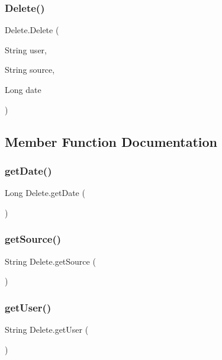 \subsubsection{\texorpdfstring{Delete()}{Delete()}}
{\footnotesize\ttfamily Delete.\+Delete (\begin{DoxyParamCaption}\item[{String}]{user,  }\item[{String}]{source,  }\item[{Long}]{date }\end{DoxyParamCaption})}



\subsection{Member Function Documentation}
\mbox{\label{class_delete_a65c0b139726126a7c0a0bfef168bbe84}} 
\subsubsection{\texorpdfstring{get\+Date()}{getDate()}}
{\footnotesize\ttfamily Long Delete.\+get\+Date (\begin{DoxyParamCaption}{ }\end{DoxyParamCaption})}

\mbox{\label{class_delete_acc45fccf90716ebcd88990f0c6c36d43}} 
\subsubsection{\texorpdfstring{get\+Source()}{getSource()}}
{\footnotesize\ttfamily String Delete.\+get\+Source (\begin{DoxyParamCaption}{ }\end{DoxyParamCaption})}

\mbox{\label{class_delete_a127124607f6d882f87a4deabc2a95e33}} 
\subsubsection{\texorpdfstring{get\+User()}{getUser()}}
{\footnotesize\ttfamily String Delete.\+get\+User (\begin{DoxyParamCaption}{ }\end{DoxyParamCaption})}

